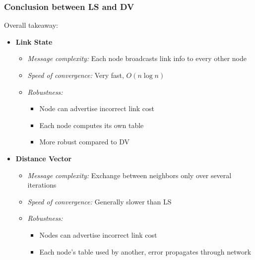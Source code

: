 \documentclass{article}
\begin{document}
\subsubsection{Conclusion between LS and DV}
Overall takeaway:
\begin{itemize}
    \item \textbf{Link State}
    \begin{itemize}
        \item \textit{Message complexity:} Each node broadcasts link info to every other node
        \item \textit{Speed of convergence:} Very fast, $O(n\log n)$
        \item \textit{Robustness:}
        \begin{itemize}
            \item Node can advertise incorrect link cost
            \item Each node computes its own table
            \item More robust compared to DV
        \end{itemize}
    \end{itemize}
    \item \textbf{Distance Vector}
    \begin{itemize}
        \item \textit{Message complexity:} Exchange between neighbors only over several iterations
        \item \textit{Speed of convergence:} Generally slower than LS
        \item \textit{Robustness:} 
        \begin{itemize}
            \item Nodes can advertise incorrect link cost
            \item Each node's table used by another, error propagates through network
        \end{itemize}
    \end{itemize}
\end{itemize}
\newpage

\end{document}
